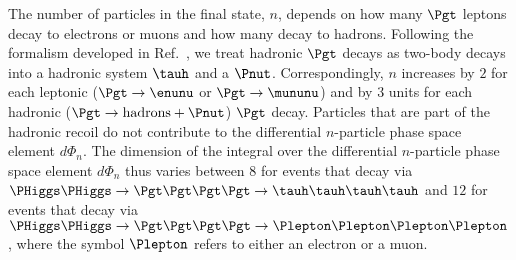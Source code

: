 {The number of particles in the final state, $n$, depends on how many $\Pgt$ leptons decay to electrons or muons 
and how many decay to hadrons.
Following the formalism developed in Ref.~\cite{SVfitMEM}, 
we treat hadronic $\Pgt$ decays as two-body decays into a hadronic system $\tauh$ and a $\Pnut$.
Correspondingly, $n$ increases by $2$ for each leptonic ($\Pgt \to \enunu$ or $\Pgt \to \mununu$) and by $3$ units for each hadronic ($\Pgt \to \textrm{hadrons} + \Pnut$) $\Pgt$ decay.
Particles that are part of the hadronic recoil do not contribute to the differential $n$-particle phase space element $d\Phi_{n}$.
The dimension of the integral over the differential $n$-particle phase space element $d\Phi_{n}$ thus
varies between $8$ for events that decay via $\PHiggs\PHiggs \to \Pgt\Pgt\Pgt\Pgt \to \tauh\tauh\tauh\tauh$ 
and $12$ for events that decay via $\PHiggs\PHiggs \to \Pgt\Pgt\Pgt\Pgt \to \Plepton\Plepton\Plepton\Plepton$,
where the symbol $\Plepton$ refers to either an electron or a muon.

}
